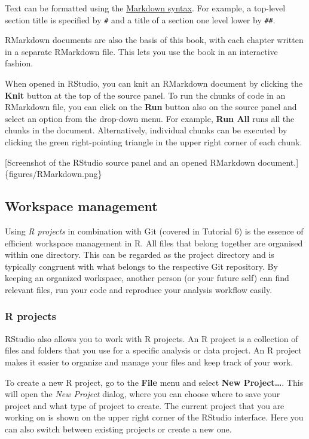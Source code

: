 \documentclass[
]{book}
\begin{document}
Text can be formatted using the \href{https://rmarkdown.rstudio.com/authoring_pandoc_markdown.html}{Markdown syntax}. For example, a top-level section title is specified by \texttt{\#} and a title of a section one level lower by \texttt{\#\#}.

RMarkdown documents are also the basis of this book, with each chapter written in a separate RMarkdown file. This lets you use the book in an interactive fashion.

When opened in RStudio, you can knit an RMarkdown document by clicking the \textbf{Knit} button at the top of the source panel. To run the chunks of code in an RMarkdown file, you can click on the \textbf{Run} button also on the source panel and select an option from the drop-down menu. For example, \textbf{Run All} runs all the chunks in the document. Alternatively, individual chunks can be executed by clicking the green right-pointing triangle in the upper right corner of each chunk.

{[}Screenshot of the RStudio source panel and an opened RMarkdown document.{]}\{figures/RMarkdown.png\}

\hypertarget{workspace-management}{%
\subsection{Workspace management}\label{workspace-management}}

Using \emph{R projects} in combination with Git (covered in \protect\hypertarget{code_mgmt}{}{Tutorial 6}) is the essence of efficient workspace management in R. All files that belong together are organised within one directory. This can be regarded as the project directory and is typically congruent with what belongs to the respective Git repository. By keeping an organized workspace, another person (or your future self) can find relevant files, run your code and reproduce your analysis workflow easily.

\hypertarget{r-projects}{%
\subsubsection{R projects}\label{r-projects}}

RStudio also allows you to work with R projects. An R project is a collection of files and folders that you use for a specific analysis or data project. An R project makes it easier to organize and manage your files and keep track of your work.

To create a new R project, go to the \textbf{File} menu and select \textbf{New Project\ldots{}}. This will open the \emph{New Project} dialog, where you can choose where to save your project and what type of project to create. The current project that you are working on is shown on the upper right corner of the RStudio interface. Here you can also switch between existing projects or create a new one.
\end{document}
